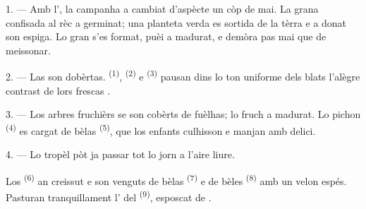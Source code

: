 %


\VUsaut{5.0mm}
\VUsaut{3.0mm}
\VUsaut{3.0mm}
\VUsaut{4.0mm}
\VUsaut{3.0mm}

1. --- Amb l', la campanha a cambiat d'aspècte un còp de mai. La
grana confisada al rèc a germinat; una planteta verda es sortida de la tèrra e a
donat son espiga. Lo gran s'es format, puèi a madurat, e demòra pas mai que de
meissonar.

2. --- Las  son dobèrtas. 
\textsuperscript{(1)},  \textsuperscript{(2)} e 
\textsuperscript{(3)} pausan dins lo ton uniforme dels blats l'alègre contrast de
lors frescas .

3. --- Los arbres fruchièrs se son cobèrts de fuèlhas; lo fruch a madurat. Lo
pichon  \textsuperscript{(4)} es cargat de bèlas 
\textsuperscript{(5)}, que los enfants culhisson e manjan amb delici.

4. --- Lo tropèl pòt ja passar tot lo jorn a l'aire liure.

Los  \textsuperscript{(6)} an creissut e son venguts de bèlas
 \textsuperscript{(7)} e de bèles 
\textsuperscript{(8)} amb un velon espés. Pasturan tranquillament l'
del  \textsuperscript{(9)}, esposcat de .

